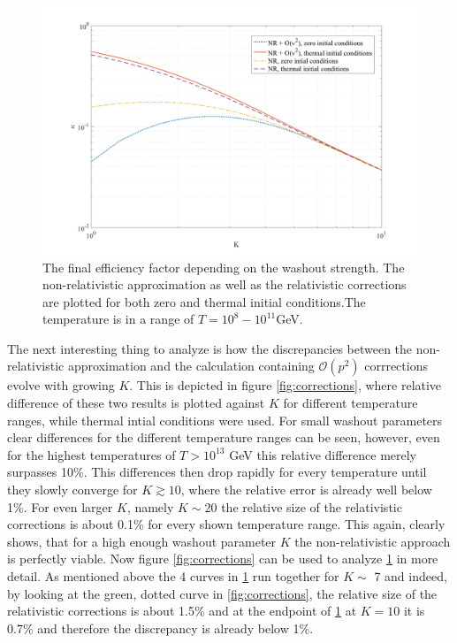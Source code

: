 \begin{figure}[H]
	\centering
	\includegraphics[width=\linewidth]{Images/efficiency}
	\caption{The final efficiency factor depending on the washout strength. The non-relativistic approximation as well as the relativistic corrections are plotted for both zero and thermal initial conditions.The temperature is in a range of $T=10^{8}-10^{11}$GeV.}
	\label{fig:efficiency}
\end{figure}
The next interesting thing to analyze is how the discrepancies between the non-relativistic approximation and the calculation containing $\mathcal{O}(p^2)$ corrrections evolve with growing $K$. This is depicted in figure \ref{fig:corrections}, where relative difference of these two results is plotted against $K$ for different temperature ranges, while thermal intial conditions were used. For small washout parameters clear differences for the different temperature ranges can be seen, however, even for the highest temperatures of $T>10^{13}$ GeV this relative difference merely surpasses 10\%. This differences then drop rapidly for every temperature until they slowly converge for $K\gtrsim10$, where the relative error is already well below 1\%. For even larger $K$, namely $K\sim20$ the relative size of the relativistic corrections is about 0.1\% for every shown temperature range. This again, clearly shows, that for a high enough washout parameter $K$ the non-relativistic approach is perfectly viable. \newline \indent
Now figure \ref{fig:corrections} can be used to analyze \ref{fig:efficiency} in more detail. As mentioned above the 4 curves in \ref{fig:efficiency} run together for $K\sim$ 7 and indeed, by looking at the green, dotted curve in \ref{fig:corrections}, the relative size of the relativistic corrections is about 1.5\% and at the endpoint of \ref{fig:efficiency} at $K=10$ it is 0.7\% and therefore the discrepancy is already below 1\%.
